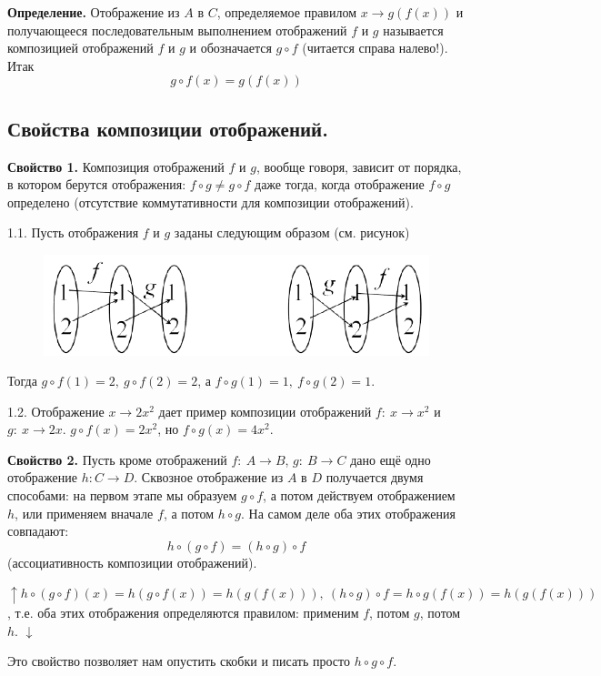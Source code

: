 \documentclass{article}
\begin{document}
    \textbf{Определение.} Отображение из $A$ в $C$, определяемое правилом $x \rightarrow g(f(x))$ и получающееся последовательным выполнением отображений $f$ и $g$ называется композицией отображений $f$ и $g$ и обозначается $g \circ f$ (читается справа налево!). Итак
    \[g \circ f(x) = g(f(x))\]

    \subsection{Свойства композиции отображений.}
    
    \textbf{Свойство 1.} Композиция отображений $f$ и $g$, вообще говоря, зависит от порядка, в котором берутся отображения: $f \circ g \neq g \circ f$ даже тогда, когда отображение $f \circ g$ определено (отсутствие коммутативности для композиции отображений).

    1.1. Пусть отображения $f$ и $g$ заданы следующим образом (см. рисунок)

    \begin{figure}[h!]
    \centering
    \includegraphics[scale=0.5]{2_3}
    \end{figure}

    Тогда $g \circ f(1) = 2,\ g \circ f(2) = 2$, а $f \circ g(1) = 1,\ f \circ g(2) = 1$.

    1.2. Отображение $x \rightarrow 2x^2$ дает пример композиции отображений $f:\ x \rightarrow x^2$ и $g:\ x \rightarrow 2x$. $g \circ f(x) = 2x^2$, но $f \circ g(x) = 4x^2$.

    \textbf{Свойство 2.} Пусть кроме отображений $f:\ A \rightarrow B$, $g:\ B \rightarrow C$ дано ещё одно отображение $h: C \rightarrow D$. Сквозное отображение из $A$ в $D$ получается двумя способами: на первом этапе мы образуем $g \circ f$, а потом действуем отображением $h$, или применяем вначале $f$, а потом $h \circ g$. На самом деле оба этих отображения совпадают:
    \[h \circ (g \circ f) = (h \circ g) \circ f\]
    (ассоциативность композиции отображений).

    $\uparrow h \circ (g \circ f)(x) = h(g \circ f(x)) = h(g(f(x))),\ (h \circ g) \circ f = h \circ g(f(x)) = h(g(f(x)))$, т.е. оба этих отображения определяются правилом: применим $f$, потом $g$, потом $h$. $\downarrow$

    Это свойство позволяет нам опустить скобки и писать просто $h \circ g \circ f$.

\end{document}
